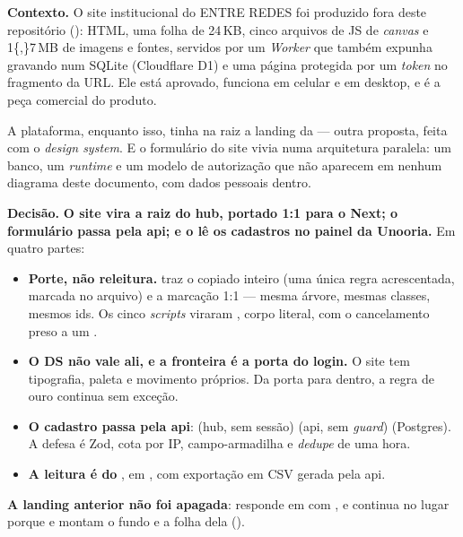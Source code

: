 \textbf{Contexto.} O site institucional do ENTRE REDES foi produzido fora deste
repositório (): HTML, uma folha de
24\,KB, cinco arquivos de JS de \emph{canvas} e \num{1{,}7}\,MB de imagens e
fontes, servidos por um \emph{Worker} que também expunha  gravando num SQLite (Cloudflare D1) e uma página
 protegida por um \emph{token} no fragmento da URL. Ele está
aprovado, funciona em celular e em desktop, e é a peça comercial do produto.

A plataforma, enquanto isso, tinha na raiz a landing da  --- outra
proposta, feita com o \emph{design system}. E o formulário do site vivia numa
arquitetura paralela: um banco, um \emph{runtime} e um modelo de autorização que
não aparecem em nenhum diagrama deste documento, com dados pessoais dentro.

\textbf{Decisão.} \textbf{O site vira a raiz do hub, portado 1:1 para o Next; o
formulário passa pela api; e o  lê os cadastros no painel da
Unooria.} Em quatro partes:

\begin{itemize}
  \item \textbf{Porte, não releitura.}  traz o
     copiado inteiro (uma única regra acrescentada, marcada no
    arquivo) e a marcação 1:1 --- mesma árvore, mesmas classes, mesmos ids. Os
    cinco \emph{scripts} viraram , corpo literal, com o
    cancelamento preso a um .
  \item \textbf{O DS não vale ali, e a fronteira é a porta do login.} O site tem
    tipografia, paleta e movimento próprios. Da porta para dentro, a regra de
    ouro continua sem exceção.
  \item \textbf{O cadastro passa pela api}: 
    (hub, sem sessão) \seta{}  (api, sem
    \emph{guard}) \seta{}  (Postgres). A defesa é Zod, cota
    por IP, campo-armadilha e \emph{dedupe} de uma hora.
  \item \textbf{A leitura é do }, em , com
    exportação em CSV gerada pela api.
\end{itemize}

\textbf{A landing anterior não foi apagada}: responde em 
com , e  continua no lugar porque
 e  montam o fundo e a folha dela ().

